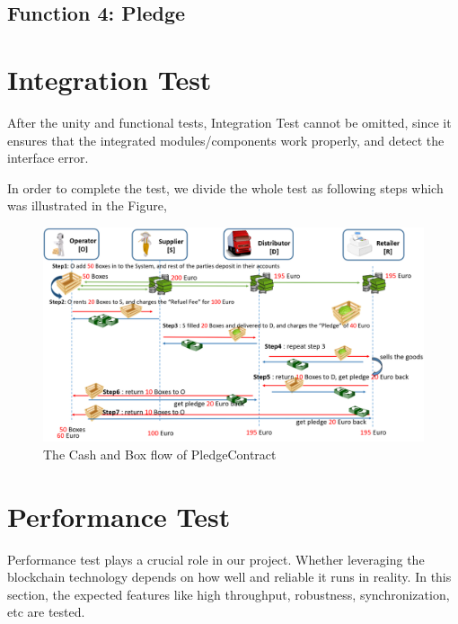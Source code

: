 \subsection{Function 4: Pledge}


\section{Integration Test}
After the unity and functional tests, Integration Test cannot be omitted, since it ensures that the integrated modules/components work properly, and detect the interface error.

In order to complete the test, we divide the whole test as following steps which was illustrated in the Figure, 
\begin{figure}[H]%
	\includegraphics[width=\textwidth]{charts/c7-test-overview}
	\caption{The Cash and Box flow of PledgeContract}
\end{figure}



\section{Performance Test}
Performance test plays a crucial role in our project. Whether leveraging the blockchain technology depends on how well and reliable it runs in reality. In this section, the expected features like high throughput, robustness, synchronization, etc are tested. 

